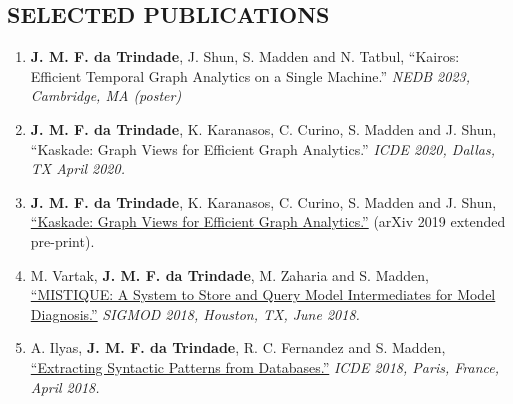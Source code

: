 \documentclass[centered,overlapped]{res}
\begin{document}
\begin{resume}
\section{SELECTED PUBLICATIONS}
\begin{enumerate}
  \item \textbf{J. M. F. da Trindade}, J. Shun, S. Madden and N. Tatbul, ``Kairos: Efficient Temporal Graph Analytics on a Single Machine.'' \textit{NEDB 2023, Cambridge, MA (poster)}
  \item \textbf{J. M. F. da Trindade}, K. Karanasos, C. Curino, S. Madden and J. Shun, ``Kaskade: Graph Views for Efficient Graph Analytics.'' \textit{ICDE 2020, Dallas, TX April 2020.}
  \item \textbf{J. M. F. da Trindade}, K. Karanasos, C. Curino, S. Madden and J. Shun, \href{https://arxiv.org/abs/1906.05162}{``Kaskade: Graph Views for Efficient Graph Analytics.''} (arXiv 2019 extended pre-print).
  \item M. Vartak, \textbf{J. M. F. da Trindade}, M. Zaharia and S. Madden, \href{https://cs.stanford.edu/~matei/papers/2018/sigmod_mistique.pdf}{``MISTIQUE: A System to Store and Query Model Intermediates for Model Diagnosis.''} \textit{SIGMOD 2018, Houston, TX, June 2018.}
  \item A. Ilyas, \textbf{J. M. F. da Trindade}, R. C. Fernandez and S. Madden, \href{https://arxiv.org/pdf/1710.11528.pdf}{``Extracting Syntactic Patterns from Databases.''} \textit{ICDE 2018, Paris, France, April 2018.}

\end{enumerate}
\end{resume}
\end{document}
